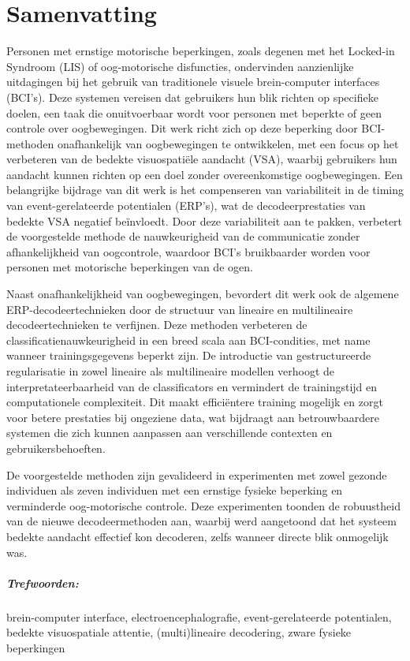 \chapter*{Samenvatting}

Personen met ernstige motorische beperkingen, zoals degenen met het
Locked-in Syndroom (LIS) of oog-motorische disfuncties, ondervinden
aanzienlijke uitdagingen bij het gebruik van traditionele visuele brein-computer interfaces (BCI's).
Deze systemen vereisen dat gebruikers hun blik richten op specifieke doelen, een taak die
onuitvoerbaar wordt voor personen met beperkte of
geen controle over oogbewegingen.
Dit werk richt zich op deze beperking door
BCI-methoden onafhankelijk van oogbewegingen te ontwikkelen, met een focus op
het verbeteren van de bedekte visuospatiële aandacht (VSA), waarbij gebruikers
hun aandacht kunnen richten op een doel zonder overeenkomstige oogbewegingen.
Een belangrijke bijdrage van dit werk is het compenseren van variabiliteit in
de timing van event-gerelateerde potentialen (ERP's), wat de decodeerprestaties
van bedekte VSA negatief beïnvloedt.
Door deze variabiliteit aan te pakken, verbetert de voorgestelde methode de
nauwkeurigheid van de communicatie zonder afhankelijkheid van oogcontrole,
waardoor BCI's bruikbaarder worden voor personen met motorische beperkingen van
de ogen.

Naast onafhankelijkheid van oogbewegingen, bevordert dit werk ook de algemene
ERP-decodeertechnieken door de structuur van lineaire en multilineaire
decodeertechnieken te verfijnen.
Deze methoden verbeteren de classificatienauwkeurigheid in een breed scala aan
BCI-condities, met name wanneer trainingsgegevens beperkt zijn.
De introductie van gestructureerde regularisatie in zowel lineaire als
multilineaire modellen verhoogt de interpretateerbaarheid van de classificators
en vermindert de trainingstijd en computationele complexiteit.
Dit maakt efficiëntere training mogelijk en zorgt voor betere prestaties bij
ongeziene data, wat bijdraagt aan betrouwbaardere systemen die zich kunnen
aanpassen aan verschillende contexten en gebruikersbehoeften.

De voorgestelde methoden zijn gevalideerd in experimenten met zowel gezonde
individuen als zeven individuen met een ernstige fysieke beperking en verminderde
oog-motorische controle.
Deze experimenten toonden de robuustheid van de nieuwe decodeermethoden aan,
waarbij werd aangetoond dat het systeem bedekte aandacht effectief kon decoderen,
zelfs wanneer directe blik onmogelijk was.

\paragraph{Trefwoorden:} brein-computer interface, electroencephalografie,
event-gerelateerde potentialen, bedekte visuospatiale attentie, (multi)lineaire
decodering, zware fysieke beperkingen
